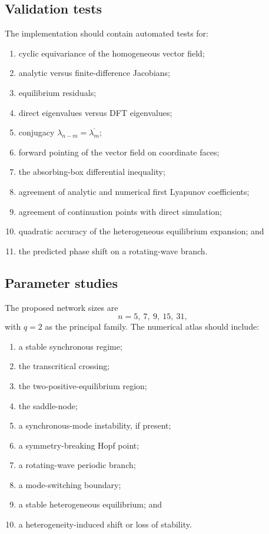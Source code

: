 \documentclass[11pt, reqno]{amsart}
\theoremstyle{definition}
\theoremstyle{remark}
\begin{document}

\subsection{Validation tests}

The implementation should contain automated tests for:
\begin{enumerate}[label=(V\arabic*),leftmargin=3em]
    \item cyclic equivariance of the homogeneous vector field;
    \item analytic versus finite-difference Jacobians;
    \item equilibrium residuals;
    \item direct eigenvalues versus DFT eigenvalues;
    \item conjugacy $\lambda_{n-m}=\overline{\lambda_m}$;
    \item forward pointing of the vector field on coordinate faces;
    \item the absorbing-box differential inequality;
    \item agreement of analytic and numerical first Lyapunov coefficients;
    \item agreement of continuation points with direct simulation;
    \item quadratic accuracy of the heterogeneous equilibrium expansion; and
    \item the predicted phase shift on a rotating-wave branch.
\end{enumerate}

\subsection{Parameter studies}

The proposed network sizes are
\[
    n=5,\ 7,\ 9,\ 15,\ 31,
\]
with $q=2$ as the principal family.  The numerical atlas should include:
\begin{enumerate}[label=(\arabic*),leftmargin=2.5em]
    \item a stable synchronous regime;
    \item the transcritical crossing;
    \item the two-positive-equilibrium region;
    \item the saddle-node;
    \item a synchronous-mode instability, if present;
    \item a symmetry-breaking Hopf point;
    \item a rotating-wave periodic branch;
    \item a mode-switching boundary;
    \item a stable heterogeneous equilibrium; and
    \item a heterogeneity-induced shift or loss of stability.
\end{enumerate}
\end{document}
